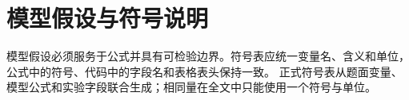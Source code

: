 \section{模型假设与符号说明}
模型假设必须服务于公式并具有可检验边界。符号表应统一变量名、含义和单位，公式中的符号、代码中的字段名和表格表头保持一致。
正式符号表从题面变量、模型公式和实验字段联合生成；相同量在全文中只能使用一个符号与单位。
